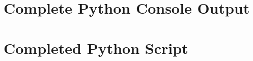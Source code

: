 \documentclass[11pt,a4paper]{article}
\begin{document}
\appendix
\section{Complete Python Console Output}


\section{Completed Python Script}

\end{document}
